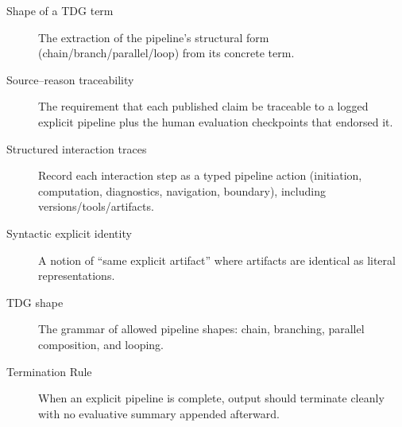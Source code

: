 \begin{description}
\item[Shape of a TDG term] The extraction of the pipeline’s structural form (chain/branch/parallel/loop) from its concrete term.

\item[Source--reason traceability] The requirement that each published claim be traceable to a logged explicit pipeline plus the human evaluation checkpoints that endorsed it.

\item[Structured interaction traces] Record each interaction step as a typed pipeline action (initiation, computation, diagnostics, navigation, boundary), including versions/tools/artifacts.

\item[Syntactic explicit identity] A notion of “same explicit artifact” where artifacts are identical as literal representations.

\item[TDG shape] The grammar of allowed pipeline shapes: chain, branching, parallel composition, and looping.

\item[Termination Rule] When an explicit pipeline is complete, output should terminate cleanly with no evaluative summary appended afterward.

\end{description}

